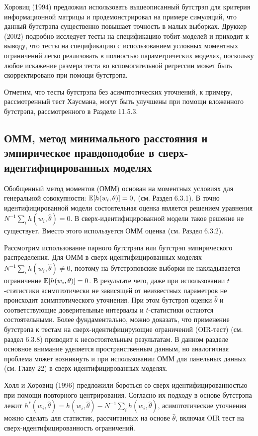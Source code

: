 Хоровиц (1994) предложил использовать вышеописанный бутстрэп для критерия информационной матрицы и продемонстрировал на примере симуляций, что данный бутстрэпа существенно повышает точность в малых выборках. Друккер (2002) подробно исследует тесты на спецификацию тобит-моделей и приходит к выводу, что тесты на спецификацию с использованием условных моментных ограничений легко реализовать в полностью параметрических моделях,  поскольку любое искажение размера теста во вспомогательной регрессии может быть скорректировано при помощи бутстрэпа.

Отметим, что тесты бутстрэпа без асимптотических уточнений, к примеру, рассмотренный тест Хаусмана, могут быть улучшены при помощи вложенного бутстрэпа, рассмотренного в Разделе 11.5.3.

\subsection{ОММ, метод минимального расстояния и эмпирическое правдоподобие в сверх-идентифицированных моделях}


Обобщенный метод моментов (ОММ) основан на моментных условиях для генеральной совокупности: $\mathbb{E}[h(w_i,\theta)]=0$, (см. Раздел 6.3.1). В точно идентифицированной модели состоятельная оценка является решением уравнения $N^{-1}\sum_{i}h(w_i,\hat{\theta}) = 0$. В сверх-идентифицированной модели такое решение не существует. Вместо  этого используется ОММ оценка (см. Раздел 6.3.2).

Рассмотрим использование парного бутстрэпа или  бутстрэп эмпирического распределения. Для ОММ в сверх-идентифицированных моделях $N^{-1}\sum_{i}h(w_i,\hat{\theta}) \neq 0$, поэтому на бутстрэповские выборки  не накладывается ограничение  $\mathbb{E}[h(w_i,\theta)]=0$. В результате чего, даже при использовании  $t$-статистики асимптотически не зависящей от неизвестных параметров не происходит асимптотического уточнения.  При этом бутстрэп оценки $\hat{\theta}$ и соответствующие доверительные интервалы и $t$-статистики остаются состоятельными. Более фундаментально, можно доказать, что применение бутстрэпа к тестам на сверх-идентифицирующие ограничений (OIR-тест) (см. раздел 6.3.8) приводит к несостоятельным результатам. В данном разделе основное внимание уделяется пространственным данным, но аналогичная проблема может возникнуть и при использовании  ОММ для панельных данных (см. Главу 22) в сверх-идентифицированных моделях.

Холл и Хоровиц (1996) предложили бороться со сверх-идентифицированностью при помощи повторного центрирования. Согласно их подходу в основе бутстрэпа лежит $h^{*}(w_i,\hat{\theta})=h(w_i,\hat{\theta})-N^{-1} \sum_{i} h(w_i,\hat{\theta})$, асимптотические уточнения  можно сделать для статистик, рассчитанных на основе $\hat{\theta}$, включая OIR тест на сверх-идентифицированность ограничений. 

